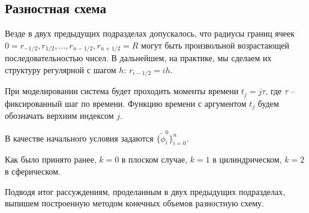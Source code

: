 \documentclass[a4paper,12pt]{article}
\theoremstyle{plain}
\theoremstyle{definition}
\begin{document}
\subsection{Разностная схема}

Везде в двух предыдущих подразделах допускалось, что радиусы границ ячеек $0 = r_{-1/2}, r_{1/2}, ..., r_{n - 1/2}, r_{n + 1/2} = R$ могут быть произвольной возрастающей последовательностью чисел. В дальнейшем, на практике, мы сделаем их структуру регулярной с шагом $h$: $r_{i - 1/2} = ih$.

При моделировании система будет проходить моменты времени $t_j = j \tau$, где $\tau$ -- фиксированный шаг по времени. Функцию времени с аргументом $t_j$ будем обозначать верхним индексом $j$.

В качестве начального условия задаются $\{ \widetilde{\phi}_i^0 \}_{i = 0}^n$.

Как было принято ранее, $k = 0$ в плоском случае, $k = 1$ в цилиндрическом, $k = 2$ в сферическом.

Подводя итог рассуждениям, проделанным в двух предыдущих подразделах, выпишем построенную методом конечных объемов разностную схему.
\end{document}
